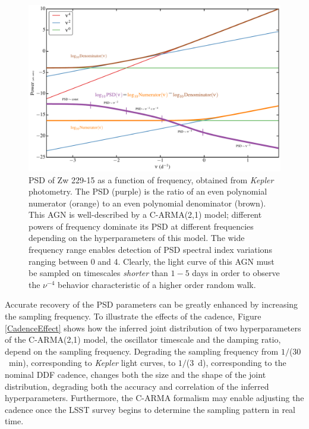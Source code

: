 \begin{figure}
\centering\includegraphics[width=0.9\linewidth]{figs/agn/AGN_Variability_01.pdf}
\caption{PSD of Zw 229-15 as a function of frequency, obtained from {\em Kepler}
photometry. The PSD (purple) is the ratio of an even polynomial numerator (orange)
to an even polynomial denominator (brown). This AGN is well-described by a
C-ARMA(2,1) model; different powers of frequency dominate its PSD at different
frequencies depending on the hyperparameters of this model. The wide
frequency range enables detection of PSD spectral index variations ranging
between 0 and 4. Clearly, the light curve of this AGN must be sampled on
timescales {\em shorter} than $1-5$ days in order to observe the $\nu^{-4}$
behavior characteristic of a higher order random walk.
}
\label{PSDvsFreq}
\end{figure}

Accurate recovery of the PSD parameters can be greatly enhanced by increasing the
sampling frequency. To illustrate the effects of the cadence, Figure \ref{CadenceEffect}
shows how the inferred joint distribution of two hyperparameters of the C-ARMA(2,1)
model, the oscillator timescale and the damping ratio, depend on the sampling frequency.
Degrading the sampling frequency from $1/$($30$~min), corresponding to {\em Kepler}
light curves, to $1/$($3$~d), corresponding to the nominal DDF cadence, changes both
the size and the shape of the joint distribution, degrading both the accuracy and
correlation of the inferred hyperparameters.
%
Furthermore, the C-ARMA formalism may enable adjusting the cadence once the LSST survey
begins to determine the sampling pattern in real time.

